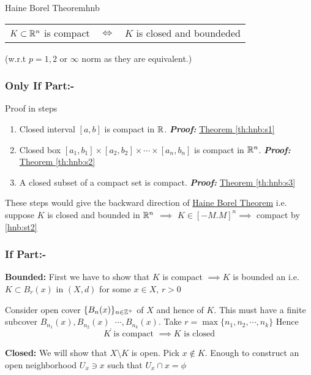 \begin{Theorem}{Haine Borel Theorem}{hnb}
	\begin{center}
		\begin{tabular}{rcl}
			$K\subset \mathbb{R}^n$ is compact & $\iff$ & $K$ is closed and boundeded
		\end{tabular}
	\end{center}
	(w.r.t $p=1,2$ or $\infty$ norm as they are equivalent.)
\end{Theorem}
\begin{myproof}
	\subsubsection{Only If Part:-}
	Proof in steps
	\begin{enumerate}[label=\bfseries\tiny\protect\circled{\small\arabic*}]
		\item \label{hnb:st1}Closed interval $[a,b]$ is compact in $\mathbb{R}$. \textbf{\textit{Proof:}} \hyperref[th:hnb:s1]{Theorem \ref{th:hnb:s1}}
		\item \label{hnb:st2}Closed box $[a_1,b_1]\times [a_2,b_2]\times\cdots\times
			      [a_n,b_n]$ is compact in $\mathbb{R}^n$. \textbf{\textit{Proof:}} \hyperref[th:hnb:s2]{Theorem \ref{th:hnb:s2}}
		\item \label{hnb:st3}A closed subset of a compact set is compact. \textbf{\textit{Proof:}} \hyperref[th:hnb:s3]{Theorem \ref{th:hnb:s3}}
	\end{enumerate}
	These steps would give the backward direction of \hyperref[th:hnb]{Haine Borel	Theorem} i.e. suppose $K$ is closed and bounded in $\mathbb{R}^n$ $\implies$ $K\in [-M.M]^n\implies $ compact by \ref{hnb:st2}

	\subsubsection{If Part:-}
	\textbf{Bounded:} First we have to show that $K$ is compact $\implies K$ is	bounded an i.e. $K\subset B_r(x)$ in $(X,d)$ for some $x\in X$, $r>0$

	Consider open cover $\{B_n(x)\}_{n\in\mathbb{Z}^+}$ of $X$ and hence of $K$. This must 	have a finite subcover $B_{n_1}(x),B_{n_2}(x)_,$ $\cdots ,B_{n_k}(x)$. Take $r=\max\{n_1,n_2,\cdots,n_k\}$ Hence $$K\text{ is compact }\implies K\text{ is
			closed}$$

	\parinf\textbf{Closed: }\parinn We will show that $X\setminus K$ is open. Pick $x\notin K$. Enough to construct an open neighborhood $U_x\ni x$ such that $U_x\cap x=\phi$


\end{myproof}
